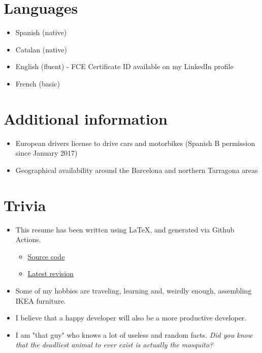 \documentclass{article}
\newcommand{\nl}{\vspace{3mm}}
\begin{document}
{	\nl

	\section*{Languages}
	\begin{itemize}
		\setlength\itemsep{0em}
		\item Spanish (native)
		\item Catalan (native)
		\item English (fluent) - FCE Certificate ID available on my LinkedIn profile
		\item French (basic)
	\end{itemize}
	
	\section*{Additional information}
	\begin{itemize}
		\setlength\itemsep{0em}
		\item European drivers license to drive cars and motorbikes (Spanish B permission since January 2017)
		\item Geographical availability around the Barcelona and northern Tarragona areas
	\end{itemize}
	
	\section*{Trivia}
	\begin{itemize}
		\item This resume has been written using \LaTeX, and generated via Github Actions.
		\begin{itemize}
			\item \textcolor{Green}{\href{https://github.com/Kyngo/Resume}{Source code}}
			\item \textcolor{Green}{\href{https://github.com/Kyngo/Resume/releases/latest}{Latest revision}}
		\end{itemize}
		\item Some of my hobbies are traveling, learning and, weirdly enough, assembling IKEA furniture.
		\item I believe that a happy developer will also be a more productive developer.
		\item I am "that guy" who knows a lot of useless and random facts. \textit{Did you know that the deadliest animal to ever exist is actually the mosquito?}
	\end{itemize}
	
}
\end{document}

